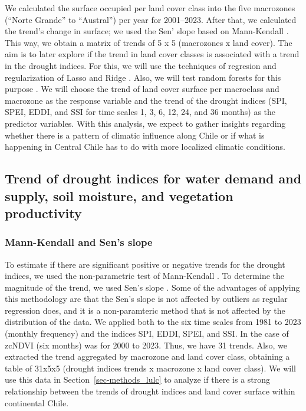 \documentclass[
  authoryear,
  preprint,
  3p,
  onecolumn]{elsarticle}
\begin{document}
We calculated the surface occupied per land cover class into the five
macrozones (``Norte Grande'' to ``Austral'') per year for 2001--2023.
After that, we calculated the trend's change in surface; we used the
Sen' slope \citep{Sen1968} based on Mann-Kendall \citep{Kendall1975}.
This way, we obtain a matrix of trends of 5 x 5 (macrozones x land
cover). The aim is to later explore if the trend in land cover classes
is associated with a trend in the drought indices. For this, we will use
the techniques of regresion and regularization of Lasso
\citep{Tibshirani2010} and Ridge \citep{Hoerl1970}. Also, we will test
random forests for this purpose \citep{Ho1995}. We will choose the trend
of land cover surface per macroclass and macrozone as the response
variable and the trend of the drought indices (SPI, SPEI, EDDI, and SSI
for time scales 1, 3, 6, 12, 24, and 36 months) as the predictor
variables. With this analysis, we expect to gather insights regarding
whether there is a pattern of climatic influence along Chile or if what
is happening in Central Chile has to do with more localized climatic
conditions.

\hypertarget{trend-of-drought-indices-for-water-demand-and-supply-soil-moisture-and-vegetation-productivity}{%
\subsection{Trend of drought indices for water demand and supply, soil
moisture, and vegetation
productivity}\label{trend-of-drought-indices-for-water-demand-and-supply-soil-moisture-and-vegetation-productivity}}

\hypertarget{mann-kendall-and-sens-slope}{%
\subsubsection{Mann-Kendall and Sen's
slope}\label{mann-kendall-and-sens-slope}}

To estimate if there are significant positive or negative trends for the
drought indices, we used the non-parametric test of Mann-Kendall
\citep{Kendall1975}. To determine the magnitude of the trend, we used
Sen's slope \citep{Sen1968}. Some of the advantages of applying this
methodology are that the Sen's slope is not affected by outliers as
regular regression does, and it is a non-paramteric method that is not
affected by the distribution of the data. We applied both to the six
time scales from 1981 to 2023 (monthly frequency) and the indices SPI,
EDDI, SPEI, and SSI. In the case of zcNDVI (six months) was for 2000 to
2023. Thus, we have 31 trends. Also, we extracted the trend aggregated
by macrozone and land cover class, obtaining a table of 31x5x5 (drought
indices trends x macrozone x land cover class). We will use this data in
Section~\ref{sec-methods_lulc} to analyze if there is a strong
relationship between the trends of drought indices and land cover
surface within continental Chile.
\end{document}
